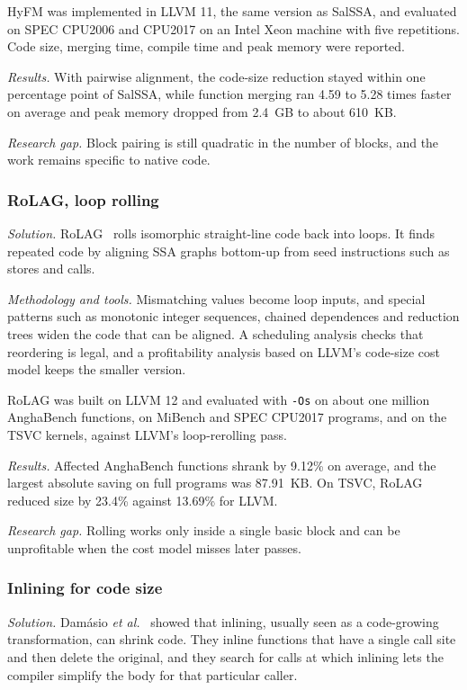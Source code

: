 \documentclass{ieeeaccess}
\begin{document}
HyFM was implemented in LLVM 11, the same version as SalSSA, and evaluated on SPEC CPU2006 and CPU2017 on an Intel Xeon machine with five repetitions. Code size, merging time, compile time and peak memory were reported.

\textit{Results.} With pairwise alignment, the code-size reduction stayed within one percentage point of SalSSA, while function merging ran 4.59 to 5.28 times faster on average and peak memory dropped from 2.4~GB to about 610~KB.

\textit{Research gap.} Block pairing is still quadratic in the number of blocks, and the work remains specific to native code.

\subsubsection{RoLAG, loop rolling}
\textit{Solution.} RoLAG~\cite{rocha2022rolag} rolls isomorphic straight-line code back into loops. It finds repeated code by aligning SSA graphs bottom-up from seed instructions such as stores and calls.

\textit{Methodology and tools.} Mismatching values become loop inputs, and special patterns such as monotonic integer sequences, chained dependences and reduction trees widen the code that can be aligned. A scheduling analysis checks that reordering is legal, and a profitability analysis based on LLVM's code-size cost model keeps the smaller version.

RoLAG was built on LLVM 12 and evaluated with \texttt{-Os} on about one million AnghaBench functions, on MiBench and SPEC CPU2017 programs, and on the TSVC kernels, against LLVM's loop-rerolling pass.

\textit{Results.} Affected AnghaBench functions shrank by 9.12\% on average, and the largest absolute saving on full programs was 87.91~KB. On TSVC, RoLAG reduced size by 23.4\% against 13.69\% for LLVM.

\textit{Research gap.} Rolling works only inside a single basic block and can be unprofitable when the cost model misses later passes.

\subsubsection{Inlining for code size}
\textit{Solution.} Dam\'asio \textit{et al.}~\cite{damasio2021inlining} showed that inlining, usually seen as a code-growing transformation, can shrink code. They inline functions that have a single call site and then delete the original, and they search for calls at which inlining lets the compiler simplify the body for that particular caller.
\end{document}
